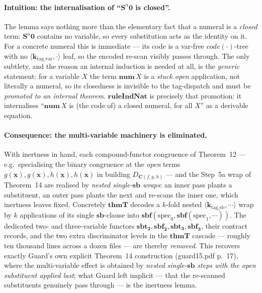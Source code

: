 \documentclass[11pt]{article}
\theoremstyle{plain}
\theoremstyle{definition}
\theoremstyle{remark}
\newcommand{\code}[1]{\mathit{code}(#1)}
\newcommand{\sbf}{\mathbf{sbf}}
\newcommand{\sbftwo}{\mathbf{sbf_2}}
\newcommand{\sbttwo}{\mathbf{sbt_2}}
\newcommand{\thmT}{\mathbf{thmT}}
\newcommand{\num}{\mathbf{num}}
\newcommand{\seq}[1]{\langle #1 \rangle}
\begin{document}
\paragraph{Intuition: the internalisation of ``$\mathbf{S}^n\mathbf{0}$ is
closed''.}  The lemma says nothing more than the elementary fact that a
numeral is a \emph{closed} term: $\mathbf{S}^n\mathbf{0}$ contains no
variable, so every substitution acts as the identity on it.  For a concrete
numeral this is immediate --- its code is a var-free $\code{\cdot}$-tree with
no $\seq{\mathbf{k}_{\mathrm{tag\_var}}, \cdot}$ leaf, so the encoded re-scan
visibly passes through.  The only subtlety, and the reason an internal
induction is needed at all, is the \emph{generic} statement: for a variable
$X$ the term $\num\,X$ is a \emph{stuck open} application, not literally a
numeral, so its closedness is invisible to the tag-dispatch and must be
\emph{promoted to an internal theorem}.  $\mathbf{ruleIndNat}$ is precisely
that promotion: it internalises ``$\num\,X$ is (the code of) a closed
numeral, for all $X$'' as a derivable equation.

\paragraph{Consequence: the multi-variable machinery is eliminated.}  With
inertness in hand, each compound-functor congruence of Theorem~12 --- e.g.\
specialising the binary congruence at the \emph{open} terms
$g(\underline{\mathbf{x}}), g(\mathbf{x}), h(\underline{\mathbf{x}}),
h(\mathbf{x})$ in building $D_{\mathbf{C}(f,g,h)}$ --- and the Step~5a wrap of
Theorem~14 are realised by \emph{nested single-$\mathbf{sb}$ wraps}: an inner
pass plants a substituent, an outer pass plants the next and re-scans the
inner one, which inertness leaves fixed.  Concretely $\thmT$ decodes a
$k$-fold nested $\seq{\mathbf{k}_{\mathrm{tag\_sb}}, \cdots}$ wrap by $k$
applications of its single $\mathbf{sb}$-clause into
$\sbf(\mathrm{spec}_0,\sbf(\mathrm{spec}_1,\cdots))$.  The dedicated two- and
three-variable functors $\sbttwo,\sbftwo,\mathbf{sbt_3},\mathbf{sbf_3}$, their
contract records, and the two extra discriminator levels in the $\thmT$
cascade --- roughly ten thousand lines across a dozen files --- are thereby
\emph{removed}.  This recovers exactly Guard's own explicit Theorem~14
construction (guard15.pdf p.~17), where the multi-variable effect is obtained
by \emph{nested single-$\mathbf{sb}$ steps with the open substituent applied
last}; what Guard left implicit --- that the re-scanned substituents
genuinely pass through --- is the inertness lemma.
\end{document}
